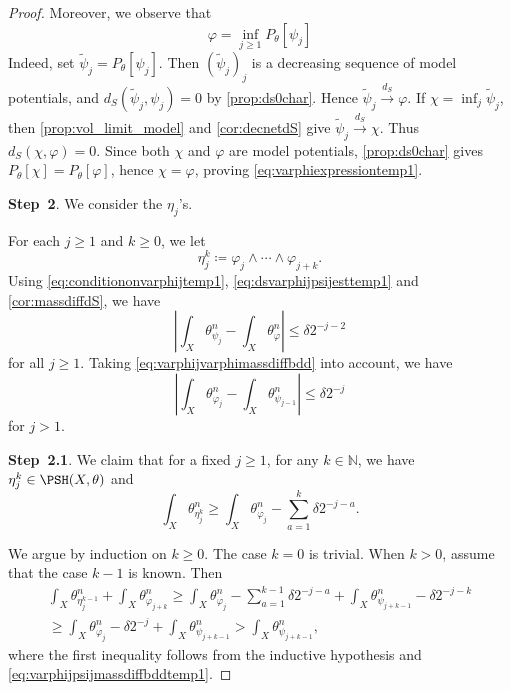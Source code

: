 \begin{proof}
    Moreover, we observe that
    \begin{equation}\label{eq:varphiexpressiontemp1}
        \varphi=\inf_{j\geq 1} P_{\theta}[\psi_j]
    \end{equation}
    Indeed, set $\tilde{\psi}_j=P_{\theta}[\psi_j]$. Then $(\tilde{\psi}_j)_j$ is a decreasing sequence of model potentials, and $d_S(\tilde{\psi}_j,\psi_j)=0$ by \cref{prop:ds0char}. Hence $\tilde{\psi}_j\xrightarrow{d_S}\varphi$. If $\chi=\inf_j\tilde{\psi}_j$, then \cref{prop:vol_limit_model} and \cref{cor:decnetdS} give $\tilde{\psi}_j\xrightarrow{d_S}\chi$. Thus $d_S(\chi,\varphi)=0$. Since both $\chi$ and $\varphi$ are model potentials, \cref{prop:ds0char} gives $P_{\theta}[\chi]=P_{\theta}[\varphi]$, hence $\chi=\varphi$, proving \eqref{eq:varphiexpressiontemp1}.

    \textbf{Step~2}. We consider the $\eta_j$'s.

    For each $j\geq 1$ and $k\geq 0$, we let
    \[
        \eta_j^k\coloneqq \varphi_j\land \cdots \land \varphi_{j+k}.
    \]
    Using \eqref{eq:conditiononvarphijtemp1}, \eqref{eq:dsvarphijpsijesttemp1} and \cref{cor:massdiffdS}, we have
    \[
        \left|\int_X\theta_{\psi_j}^n-\int_X \theta_{\varphi}^n \right|\leq \delta 2^{-j-2}
    \]
    for all $j\geq 1$. Taking \eqref{eq:varphijvarphimassdiffbdd} into account, we have
    \begin{equation}\label{eq:varphijpsijmassdiffbddtemp1}
     \left|\int_X\theta_{\varphi_j}^n-\int_X \theta_{\psi_{j-1}}^n \right|\leq \delta 2^{-j}
    \end{equation}
    for $j>1$.

    \textbf{Step~2.1}.
     We claim that for a fixed $j\geq 1$, for any $k\in \mathbb{N}$, we have
    $\eta_j^k\in \PSH(X,\theta)$ and
    \begin{equation}\label{eq:etajkmassbddbelowtemp1}
        \int_X \theta_{\eta_j^k}^n\geq \int_X \theta_{\varphi_j}^n-\sum_{a=1}^{k} \delta 2^{-j-a}.
    \end{equation}

    We argue by induction on $k\geq 0$.
    The case $k=0$ is trivial. When $k>0$, assume that the case $k-1$ is known. Then
    \[
        \begin{aligned}
            \int_X \theta_{\eta_j^{k-1}}^n+\int_X \theta_{\varphi_{j+k}}^n
            \geq \int_X \theta_{\varphi_j}^n-\sum_{a=1}^{k-1}\delta 2^{-j-a}+\int_X \theta_{\psi_{j+k-1}}^n-\delta 2^{-j-k}\\
            \geq \int_X \theta_{\varphi_j}^n-\delta 2^{-j}+\int_X \theta_{\psi_{j+k-1}}^n>\int_X \theta_{\psi_{j+k-1}}^n,
        \end{aligned}
    \]
    where the first inequality follows from the inductive hypothesis and \eqref{eq:varphijpsijmassdiffbddtemp1}.


\end{proof}
